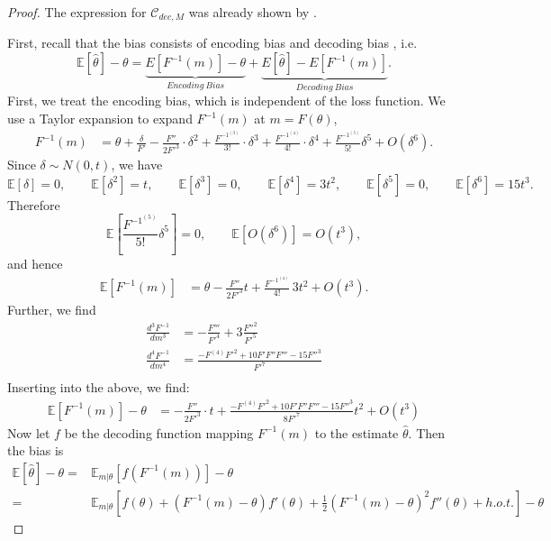 \begin{proof}
The expression for $\mathcal{C}_{dec,M}$ was already shown by \citet{hahn2024unifying}.


First, recall that the bias consists of encoding bias and decoding bias \citep{hahn2024unifying}, i.e.
\begin{equation*}
    \mathbb{E}[\hat{\theta}] - \theta = \underbrace{E[F^{-1}(m)] - \theta}_{Encoding\ Bias} + \underbrace{E[\hat{\theta}] - E[F^{-1}(m)]}_{Decoding\ Bias}.
\end{equation*}
First, we treat the encoding bias, which is independent of the loss function. We use a Taylor expansion to expand $F^{-1}(m)$ at $m = F(\theta)$,
\begin{align*}
    F^{-1}(m) &= \theta + \frac{\delta}{F'} - \frac{F''}{2F'^3} \cdot \delta^2 + \frac{F^{-1^{(3)}}}{3!} \cdot \delta^3 + \frac{F^{-1^{(4)}}}{4!} \cdot \delta^4 + \frac{F^{-1^{(5)}}}{5!}\delta^5 + O(\delta^6).
    \end{align*}
    Since \(\delta\sim N(0,t)\), we have
    \[
    \mathbb E[\delta]=0,\qquad \mathbb E[\delta^2]=t,\qquad \mathbb E[\delta^3]=0,\qquad \mathbb E[\delta^4]=3t^2,\qquad \mathbb E[\delta^5]=0,\qquad \mathbb E[\delta^6]=15t^3.
    \]
    Therefore
    \[
    \mathbb E\!\left[\frac{F^{-1^{(5)}}}{5!}\delta^5\right]=0,
    \qquad
    \mathbb E[O(\delta^6)]=O(t^3),
    \]
    and hence
    \begin{align*}
    \mathbb E[F^{-1}(m)]
    &= \theta - \frac{F''}{2F'^3}t + \frac{F^{-1^{(4)}}}{4!}\,3t^2 + O(t^3).
    \end{align*}
    Further, we find
    \begin{align*}
    \frac{d^3 F^{-1}}{d m^3} &= -\frac{F'''}{F'^4} + 3\frac{F''^2}{F'^5}\\
    \frac{d^4 F^{-1}}{d m^4} &= \frac{-F^{(4)}F'^2 + 10F'F''F''' - 15F''^3}{F'^7}\\
    \end{align*}
Inserting into the above, we find:
\begin{align}
\label{eq:encoding_bias}
\mathbb{E}[F^{-1}(m)] - \theta &= - \frac{F''}{2F'^3} \cdot t + \frac{-F^{(4)}F'^2 + 10F'F''F''' - 15F''^3}{8F'^7} t^2 + O(t^3)
\end{align}
Now let $f$ be the decoding function mapping $F^{-1}(m)$ to the estimate $\widehat{\theta}$.
Then the bias is
\begin{align*}
    \mathbb{E}[\widehat{\theta}]-\theta =& \mathbb{E}_{m|\theta}[f(F^{-1}(m))]-\theta \\
    =& \mathbb{E}_{m|\theta}[f(\theta) + (F^{-1}(m)-\theta) f'(\theta) +  \frac{1}{2} (F^{-1}(m)-\theta)^2 f''(\theta) + h.o.t. ]-\theta 

\end{align*}
\end{proof}
